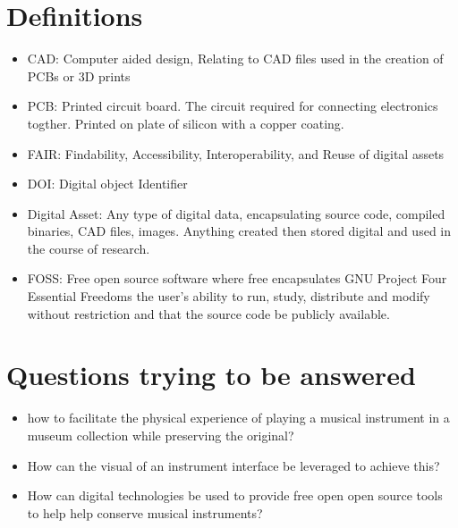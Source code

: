 \section{Definitions}

\begin{itemize}
    \item CAD: Computer aided design,  Relating to CAD files used in the creation of PCBs or 3D prints
    \item PCB: Printed circuit board. The circuit required for connecting electronics togther. Printed on plate of silicon with a copper coating.
    \item FAIR: Findability, Accessibility, Interoperability, and Reuse of digital assets    
    \item DOI: Digital object Identifier
    \item Digital Asset: Any type of digital data, encapsulating source code, compiled binaries, CAD files, images. Anything created then stored digital and used in the course of research.
    \item FOSS: Free open source software where free encapsulates GNU Project Four Essential Freedoms \cite{gnu_philosophy_2025} the user's ability to run, study, distribute and modify without restriction and that the source code be publicly available.
\end{itemize}


\section{Questions trying to be answered}

\begin{itemize}
    \item how to facilitate the physical experience of playing a musical instrument in a museum collection while preserving the original?
    \item How can the visual of an instrument interface be leveraged to achieve this?
    \item How can digital technologies be used to provide free open open source tools to help help conserve musical instruments?
\end{itemize}
